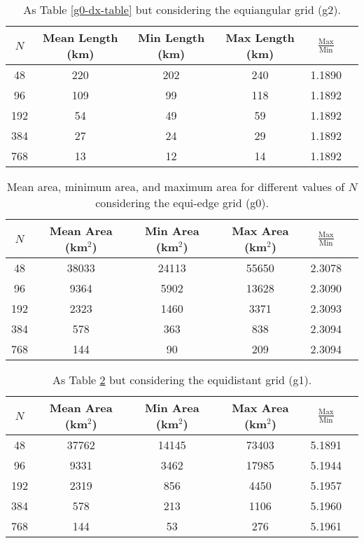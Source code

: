 \begin{table}[htbp]
    \centering
    \caption{As Table \ref{g0-dx-table} but considering the equiangular grid (g2). \label{g2-dx-table}}
    \begin{tabular}{cccccc}
        \toprule
        $N$ & Mean Length (km) & Min Length (km) & Max Length (km) & $\frac{\text{Max}}{\text{Min}}$ \\
        \midrule
        48 & 220 & 202 & 240 & 1.1890 \\
        96 & 109 & 99 & 118  & 1.1892 \\
        192 & 54 & 49 & 59  & 1.1892 \\
        384 & 27 & 24 & 29  & 1.1892 \\
        768 & 13 & 12 & 14  & 1.1892 \\
        \bottomrule
    \end{tabular}
\end{table}


\begin{table}[htbp]
    \centering
    \caption{Mean area, minimum area, and maximum area for different values of $N$ considering the equi-edge grid (g0).\label{g0-da-table}}
    \begin{tabular}{cccccc}
        \toprule
        $N$ & Mean Area (km$^2$) & Min Area (km$^2$) & Max Area (km$^2$) & $\frac{\text{Max}}{\text{Min}}$ \\
        \midrule
        48 & 38033 & 24113 & 55650 & 2.3078 \\
        96 & 9364 & 5902 & 13628 & 2.3090 \\
        192 & 2323 & 1460 & 3371 & 2.3093 \\
        384 & 578 & 363 & 838 & 2.3094 \\
        768 & 144 & 90 & 209 & 2.3094 \\
        \bottomrule
    \end{tabular}
\end{table}

\begin{table}[htbp]
    \centering
    \caption{As Table \ref{g0-da-table} but considering the equidistant grid (g1). \label{g1-da-table}}
    \begin{tabular}{cccccc}
        \toprule
        $N$ & Mean Area (km$^2$) & Min Area (km$^2$) & Max Area (km$^2$) & $\frac{\text{Max}}{\text{Min}}$ \\
        \midrule
        48 & 37762 & 14145 & 73403 & 5.1891 \\
        96 & 9331 & 3462 & 17985 & 5.1944 \\
        192 & 2319 & 856 & 4450 & 5.1957 \\
        384 & 578 & 213 & 1106 & 5.1960 \\
        768 & 144 & 53 & 276 & 5.1961 \\
        \bottomrule
    \end{tabular}
\end{table}

